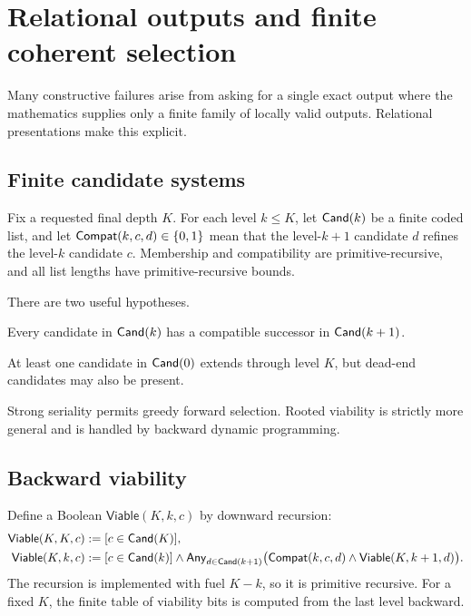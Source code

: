\section{Relational outputs and finite coherent selection}

Many constructive failures arise from asking for a single exact output where
the mathematics supplies only a finite family of locally valid outputs.
Relational presentations make this explicit.

\subsection{Finite candidate systems}

Fix a requested final depth \(K\).  For each level \(k\le K\), let
\(\mathsf{Cand}(k)\) be a finite coded list, and let
\(\mathsf{Compat}(k,c,d)\in\{0,1\}\) mean that the level-\(k+1\) candidate \(d\) refines
the level-\(k\) candidate \(c\).  Membership and compatibility are
primitive-recursive, and all list lengths have primitive-recursive bounds.

There are two useful hypotheses.

\begin{description}[leftmargin=2.7em,style=nextline]
\item[Strong seriality.]
Every candidate in \(\mathsf{Cand}(k)\) has a compatible successor in
\(\mathsf{Cand}(k+1)\).
\item[Rooted viability.]
At least one candidate in \(\mathsf{Cand}(0)\) extends through level \(K\), but
dead-end candidates may also be present.
\end{description}

Strong seriality permits greedy forward selection.  Rooted viability is
strictly more general and is handled by backward dynamic programming.

\subsection{Backward viability}

Define a Boolean \(\mathsf{Viable}(K,k,c)\) by downward recursion:
\[
\begin{aligned}
 \mathsf{Viable}(K,K,c)
   &\mathrel{:=} [c\in\mathsf{Cand}(K)],\\
 \mathsf{Viable}(K,k,c)
   &\mathrel{:=} [c\in\mathsf{Cand}(k)]\wedge
      \mathsf{Any}_{d\in\mathsf{Cand}(k+1)}
      \bigl(\mathsf{Compat}(k,c,d)\wedge
            \mathsf{Viable}(K,k+1,d)\bigr).
\end{aligned}
\]
The recursion is implemented with fuel \(K-k\), so it is primitive recursive.
For a fixed \(K\), the finite table of viability bits is computed from the
last level backward.

